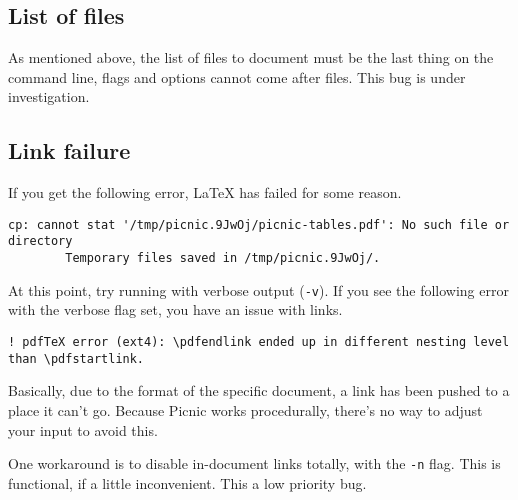 \documentclass[oneside,11pt]{article}
\begin{document}
	\subsection{List of files}
	
	As mentioned above, the list of files to document must be the last thing on 
	the command line, flags and options cannot come after files. This bug is 
	under investigation.
	
	\subsection{Link failure}
	
	If you get the following error, \LaTeX{} has failed for some reason.
	
	\begin{lstlisting}[basicstyle=\ttfamily,gobble=16, breaklines=true]
		cp: cannot stat '/tmp/picnic.9JwOj/picnic-tables.pdf': No such file or directory
		Temporary files saved in /tmp/picnic.9JwOj/.
	\end{lstlisting} 	
	
	At this point, try running with verbose output (\texttt{-v}). If you see the following error with the verbose flag set, you have an issue with links.
	
	\begin{lstlisting}[basicstyle=\ttfamily,gobble=16, breaklines=true]
		! pdfTeX error (ext4): \pdfendlink ended up in different nesting level than \pdfstartlink.
	\end{lstlisting} 
	
	Basically, due to the format of the specific document, a link has been pushed to a place it can't go. Because Picnic works procedurally, there's no way to adjust your input to avoid this.
	
	One workaround is to disable in-document links totally, with the \texttt{-n} flag. This is functional, if a little inconvenient. This a low priority bug.
	
	
\end{document}
